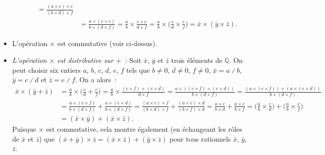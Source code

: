 \begin{itemize}[nosep]
\begin{itemize}[nosep]
\begin{equation*}
\begin{aligned}
                    = \frac{(a \times c) \times e}{(b \times d) \times f} \\
                    & = \frac{a \times (c \times e)}{b \times (d \times f)} 
                    = \frac{a}{b} \times \frac{c \times e}{d \times f} 
                    = \frac{a}{b} \times \Big( \frac{c}{d} \times \frac{e}{f} \Big)
                    = \bar{x} \times (\bar{y} \times \bar{z}) .
                \end{aligned} \end{equation*}
        \end{itemize}
    \item L'opération $\times$ est commutative (voir ci-dessus). 
    \item \emph{L'opération $\times$ est distributive sur $+$ :} 
        Soit $\bar{x}$, $\bar{y}$ et $\bar{z}$ trois éléments de $\mathbb{Q}$. 
        On peut choisir six entiers $a$, $b$, $c$, $d$, $e$, $f$ tels que $b \neq 0$, $d \neq 0$, $f \neq 0$, $\bar{x} = a \divslash b$, $\bar{y} = c \divslash d$ et $\bar{z} = e \divslash f$.
        On a alors : 
        \begin{equation*} \begin{aligned}
            \bar{x} \times (\bar{y} + \bar{z})
            & = \frac{a}{b} \times \Big( \frac{c}{d} + \frac{e}{f} \Big)
            = \frac{a}{b} \times \frac{(c \times f) + (e \times d)}{d \times f}
            = \frac{a \times ((c \times f) + (e \times d))}{b \times (d \times f)}
            = \frac{(a \times (c \times f)) + (a \times (e \times d))}{b \times (d \times f)} \\
            & = \frac{a \times (c \times f)}{b \times (d \times f)} + 
                \frac{a \times (e \times d)}{b \times (d \times f)}
            = \frac{(a \times c) \times f}{(b \times d) \times f} + 
                \frac{(a \times e) \times d}{(b \times f) \times d}
            = \frac{a \times c}{b \times d} + 
                \frac{a \times e}{b \times f}
            = \Big( \frac{a}{b} \times \frac{c}{d} \Big)
                + \Big( \frac{a}{b} \times \frac{e}{f} \Big) \\
            & = (\bar{x} \times \bar{y}) + (\bar{x} \times \bar{z}) .
        \end{aligned} \end{equation*}
        Puisque $\times$ est commutative, cela montre également (en échangeant les rôles de $\bar{x}$ et $\bar{z}$) que $(\bar{x} + \bar{y}) \times \bar{z} = (\bar{x} \times \bar{z}) + (\bar{y} \times \bar{z})$ pour tous rationnels $\bar{x}$, $\bar{y}$, $\bar{z}$.%

\end{itemize}
